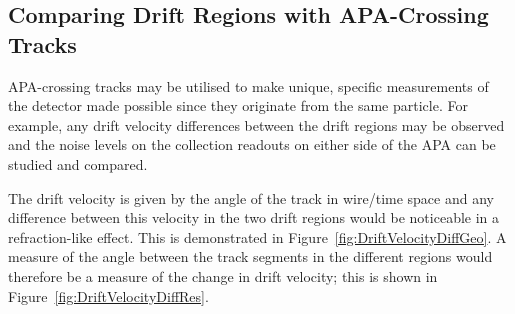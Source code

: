 \subsection{Comparing Drift Regions with APA-Crossing Tracks}\label{sec:APACrossingDriftComparison}

APA-crossing tracks may be utilised to make unique, specific measurements of the detector made possible since they originate from the same particle.  For example, any drift velocity differences between the drift regions may be observed and the noise levels on the collection readouts on either side of the APA can be studied and compared.

The drift velocity is given by the angle of the track in wire/time space and any difference between this velocity in the two drift regions would be noticeable in a refraction-like effect.  This is demonstrated in Figure~\ref{fig:DriftVelocityDiffGeo}.  A measure of the angle between the track segments in the different regions would therefore be a measure of the change in drift velocity; this is shown in Figure~\ref{fig:DriftVelocityDiffRes}.

